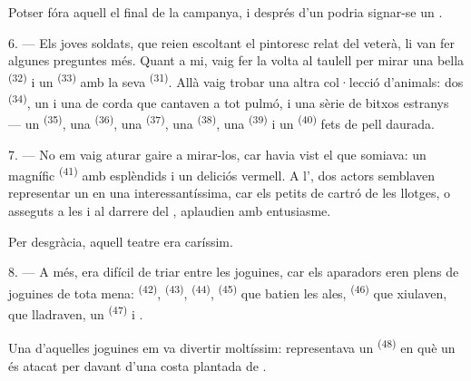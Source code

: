 Potser fóra aquell el final de la campanya, i després d'un 
podria signar-se un .

\VUsaut{4.4mm}
\VUsaut{2.8mm}

6. --- Els joves soldats, que reien escoltant el pintoresc relat del veterà, li
van fer algunes preguntes més. Quant a mi, vaig fer la volta al taulell per mirar
una bella  \textsuperscript{(32)} i un 
\textsuperscript{(33)} amb la seva  \textsuperscript{(31)}. Allà
vaig trobar una altra col·lecció d'animals: dos 
\textsuperscript{(34)}, un  i una  de corda que
cantaven a tot pulmó, i una sèrie de bitxos estranys --- un 
\textsuperscript{(35)}, una  \textsuperscript{(36)}, una
 \textsuperscript{(37)}, una  \textsuperscript{(38)},
una  \textsuperscript{(39)} i un 
\textsuperscript{(40)} fets de pell daurada.

7. --- No em vaig aturar gaire a mirar-los, car havia vist el que somiava: un
magnífic  \textsuperscript{(41)} amb esplèndids
 i un deliciós  vermell. A l', dos
actors semblaven representar un  en una 
interessantíssima, car els petits  de cartró de les llotges,
o asseguts a les  i al  darrere del
, aplaudien amb entusiasme.

Per desgràcia, aquell teatre era caríssim.

8. --- A més, era difícil de triar entre les joguines, car els aparadors eren
plens de joguines de tota mena:  \textsuperscript{(42)},
 \textsuperscript{(43)}, 
\textsuperscript{(44)},  \textsuperscript{(45)} que batien les ales,
 \textsuperscript{(46)} que xiulaven,  que
lladraven, un  \textsuperscript{(47)} i .


Una d'aquelles joguines em va divertir moltíssim: representava un  \textsuperscript{(48)} en què un  és atacat per
 davant d'una costa plantada de .

